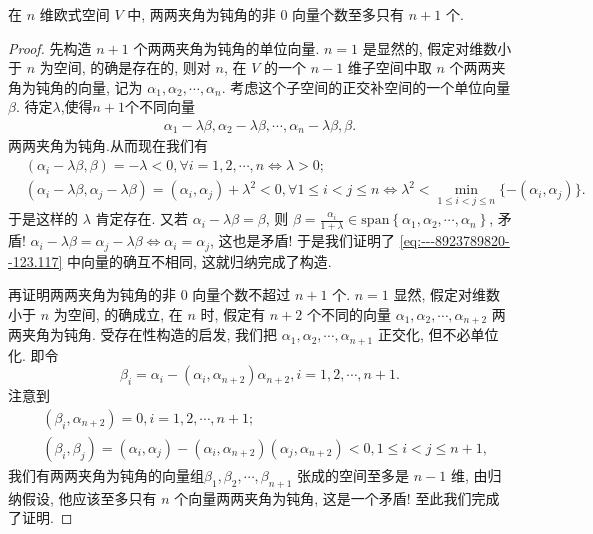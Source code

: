 \documentclass[../../main.tex]{subfiles}%
\begin{document}
\begin{example}
在 \( n \) 维欧式空间 \( V \) 中, 两两夹角为钝角的非 0 向量个数至多只有 \( n+1 \) 个.
\end{example}
\begin{proof}
先构造 \( n+1 \) 个两两夹角为钝角的单位向量. \( n=1 \) 是显然的, 假定对维数小于 \( n \) 为空间, 的确是存在的, 则对 \( n \), 在 \( V \) 的一个 \( n-1 \) 维子空间中取 \( n \) 个两两夹角为钝角的向量, 记为 \( \alpha_1, \alpha_2, \cdots, \alpha_n \). 考虑这个子空间的正交补空间的一个单位向量 \( \beta \). 待定$\lambda$,使得$n+1$个不同向量
\begin{align}
\alpha_1 - \lambda\beta, \alpha_2 - \lambda\beta, \cdots, \alpha_n - \lambda\beta, \beta. \label{eq:---8923789820--123.117}
\end{align}
两两夹角为钝角.从而现在我们有
\[
\begin{aligned}
&(\alpha_i - \lambda\beta, \beta) = -\lambda < 0, \forall i = 1, 2, \cdots, n \Leftrightarrow \lambda > 0; \\
&(\alpha_i - \lambda\beta, \alpha_j - \lambda\beta) = (\alpha_i, \alpha_j) + \lambda^2 < 0, \forall 1 \leqslant i < j \leqslant n \Leftrightarrow \lambda^2 < \min_{1 \leqslant i < j \leqslant n} \{ -(\alpha_i, \alpha_j) \}.
\end{aligned}
\]
于是这样的 \( \lambda \) 肯定存在. 又若 \( \alpha_i - \lambda\beta = \beta \), 则 \( \beta = \frac{\alpha_i}{1+\lambda} \in \mathrm{span}\left\{ \alpha _1,\alpha _2,\cdots ,\alpha _n \right\} \), 矛盾! \( \alpha_i - \lambda\beta = \alpha_j - \lambda\beta \Leftrightarrow \alpha_i = \alpha_j \), 这也是矛盾! 于是我们证明了 \eqref{eq:---8923789820--123.117} 中向量的确互不相同, 这就归纳完成了构造.

再证明两两夹角为钝角的非 0 向量个数不超过 \( n+1 \) 个. \( n=1 \) 显然, 假定对维数小于 \( n \) 为空间, 的确成立, 在 \( n \) 时, 假定有 \( n+2 \) 个不同的向量 \( \alpha_1, \alpha_2, \cdots, \alpha_{n+2} \) 两两夹角为钝角. 受存在性构造的启发, 我们把 \( \alpha_1, \alpha_2, \cdots, \alpha_{n+1} \) 正交化, 但不必单位化. 即令
\[
\beta_i = \alpha_i - (\alpha_i, \alpha_{n+2}) \alpha_{n+2}, i = 1, 2, \cdots, n+1.
\]
注意到
\[
\begin{aligned}
&(\beta_i, \alpha_{n+2}) = 0, i = 1, 2, \cdots, n+1; \\
&(\beta_i, \beta_j) = (\alpha_i, \alpha_j) - (\alpha_i, \alpha_{n+2})(\alpha_j, \alpha_{n+2}) < 0, 1 \leqslant i < j \leqslant n+1,
\end{aligned}
\]
我们有两两夹角为钝角的向量组\( \beta_1, \beta_2, \cdots, \beta_{n+1} \) 张成的空间至多是 \( n-1 \) 维, 由归纳假设, 他应该至多只有 \( n \) 个向量两两夹角为钝角, 这是一个矛盾! 至此我们完成了证明.
\end{proof}
\end{document}
